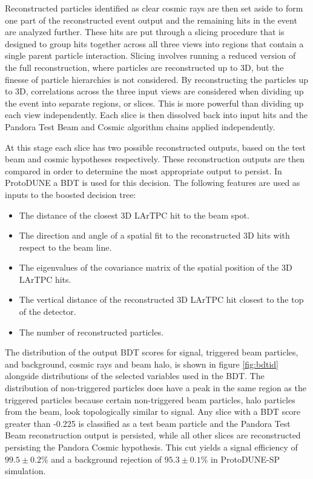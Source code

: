 Reconstructed particles identified as clear cosmic rays are then set aside to form one part of the reconstructed event output and the remaining hits in the event are analyzed further.  These hits are put through a slicing procedure that is designed to group hits together across all three views into regions that contain a single parent particle interaction.    Slicing involves running a reduced version of the full reconstruction, where particles are reconstructed up to 3D, but the finesse of particle hierarchies is not considered.  By reconstructing the particles up to 3D, correlations across the three input views are considered when dividing up the event into separate regions, or slices.  This is more powerful than dividing up each view independently.  Each slice is then dissolved back into input hits and the Pandora Test Beam and Cosmic algorithm chains applied independently.  

At this stage each slice has two possible reconstructed outputs, based on the test beam and cosmic hypotheses respectively.  These reconstruction outputs are then compared in order to determine the most appropriate output to persist.  In ProtoDUNE a BDT is used for this decision.  The following features are used as inputs to the boosted decision tree:

\begin{itemize}
\item The distance of the closest 3D LArTPC hit to the beam spot.
\item The direction and angle of a spatial fit to the reconstructed 3D hits with respect to the beam line.
\item The eigenvalues of the covariance matrix of the spatial position of the 3D LArTPC hits.
\item The vertical distance of the reconstructed 3D LArTPC hit closest to the top of the detector.
\item The number of reconstructed particles.
\end{itemize}

The distribution of the output BDT scores for signal, triggered beam particles, and background, cosmic rays and beam halo, is shown in figure \ref{fig:bdtid} alongside distributions of the selected variables used in the BDT.  The distribution of non-triggered particles does have a peak in the same region as the triggered particles because certain non-triggered beam particles, halo particles from the beam, look topologically similar to signal.  Any slice with a BDT score greater than -0.225 is classified as a test beam particle and the Pandora Test Beam reconstruction output is persisted, while all other slices are reconstructed persisting the Pandora Cosmic hypothesis.  This cut yields a signal efficiency of $99.5 \pm 0.2$\% and a background rejection of $95.3 \pm 0.1$\% in ProtoDUNE-SP simulation.

